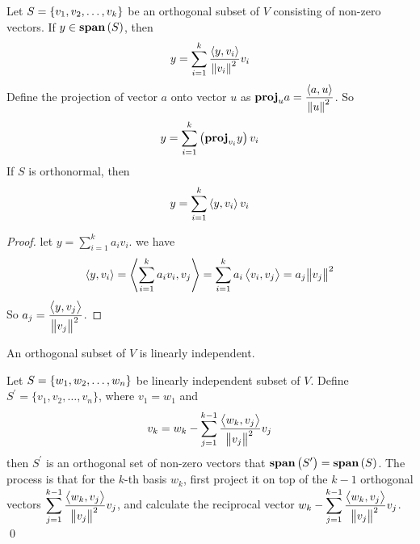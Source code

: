 \begin{theorem}
	Let $S=\set{ v_1, v_2, \dots, v_k }$ be an orthogonal subset of $V$ consisting of non-zero vectors. If $y \in \vectorspan{S}$, then
	\begin{equation}
		y = \sum_{i=1}^k \frac{\innerproduct{y}{v_i}}{\norm{v_i}^2} v_i
	\end{equation}
	Define the projection of vector $a$ onto vector $u$ as $\projection{a}{u} = \dfrac{\innerproduct{a}{u}}{\norm{u}^2}$. So 
	\begin{equation}
	    y = \sum_{i=1}^k \left(\projection{y}{v_i}\right) v_i
	\end{equation}
	If $S$ is orthonormal, then
	\begin{equation}
		y = \sum_{i=1}^k \innerproduct{y}{v_i} v_i
	\end{equation}
\end{theorem}
\begin{proof}
	let $\displaystyle y = \sum_{i=1}^k a_i v_i$. we have
	\begin{equation*}
		\innerproduct{y}{v_i} = \innerproduct{\sum_{i=1}^k a_i v_i}{v_j} = \sum_{i=1}^k a_i \innerproduct{v_i}{v_j} = a_j \norm{v_j}^2
	\end{equation*}
	So $a_j = \dfrac{\innerproduct{y}{v_j}}{\norm{v_j}^2}$.
	
	
\end{proof}

\begin{theorem}
	An orthogonal subset of $V$ is linearly independent.
\end{theorem}

\begin{definition}
	Let $S=\set{w_1, w_2, \dots, w_n }$ be linearly independent subset of $V$. Define $S^\prime=\{v_1,v_2,\dots,v_n  \}$, where $v_1=w_1$ and 
	\begin{equation}
		v_k = w_k - \sum_{j=1}^{k-1} \frac{\innerproduct{w_k}{v_j}}{\norm{v_j}^2} v_j
	\end{equation}
	then $S^\prime$ is an orthogonal set of non-zero vectors that $\vectorspan{S^\prime} = \vectorspan{S}$. The process is that for the $k$-th basis $w_k$, first project it on top of the $k-1$ orthogonal vectors $\displaystyle \sum_{j=1}^{k-1} \dfrac{\innerproduct{w_k}{v_j}}{\norm{v_j}^2} v_j$, and calculate the reciprocal vector $\displaystyle w_k - \sum_{j=1}^{k-1} \dfrac{\innerproduct{w_k}{v_j}}{\norm{v_j}^2} v_j$.
	\qed
\end{definition}

